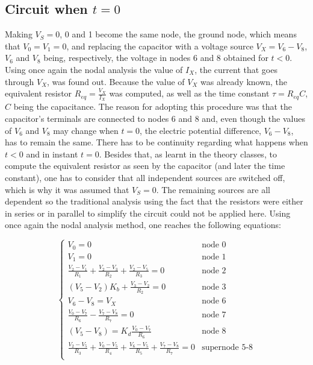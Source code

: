 




\subsection{Circuit when $t=0$} %
Making $V_S=0$, 0 and 1 become the same node, the ground node, which means that $V_0=V_1=0$, and replacing the capacitor with a voltage source $V_X=V_6-V_8$, $V_6$ and $V_8$ being, respectively, the voltage in nodes 6 and 8 obtained for $t<0$.
Using once again the nodal analysis the value of $I_X$, the current that goes through $V_X$, was found out. Because the value of $V_X$ was already known, the equivalent resistor $R_{eq} = \frac{V_X}{I_X}$ was computed, as well as the time constant $\tau = R_{eq}C$, $C$ being the capacitance.
The reason for adopting this procedure was that the capacitor's terminals are connected to nodes 6 and 8 and, even though the values of $V_6$ and $V_8$ may change when $t=0$, the electric potential difference, $V_6-V_8$, has to remain the same. There has to be continuity regarding what happens when $t<0$ and in instant $t=0$. Besides that, as learnt in the theory classes, to compute the equivalent resistor as seen by the capacitor (and later the time constant), one has to consider that all independent sources are switched off, which is why it was assumed that $V_S=0$. The remaining sources are all dependent so the traditional analysis using the fact that the resistors were either in series or in parallel to simplify the circuit could not be applied here.
Using once again the nodal analysis method, one reaches the following equations:

\begin{equation}
  \begin{cases}
  V_0=0 & \mbox{node 0} \\
  V_1=0 & \mbox{node 1} \\
  \frac{V_2-V_1}{R_1}+\frac{V_2-V_3}{R_2}+\frac{V_2-V_5}{R_3} = 0 & \mbox{node 2} \\
  (V_5-V_2)K_b + \frac{V_3-V_2}{R_2} = 0 & \mbox{node 3} \\
  V_6-V_8 = V_X & \mbox{node 6} \\
  \frac{V_0-V_7}{R_6} - \frac{V_7-V_8}{R_7} = 0 & \mbox{node 7} \\
  (V_5-V_8) = K_d \frac{V_0-V_7}{R_6} & \mbox{node 8} \\
  \frac{V_2-V_5}{R_3} + \frac{V_0-V_5}{R_4} + \frac{V_6-V_5}{R_5} + \frac{V_7-V_8}{R_7} = 0 & \mbox{supernode 5-8} \\ 
  \end{cases}
\end{equation}

